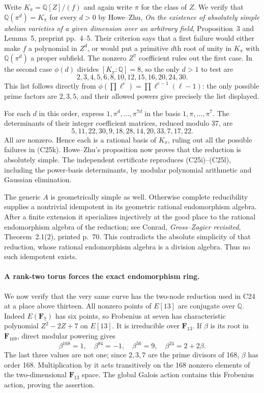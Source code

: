 \documentclass[11pt]{article}
\newcommand{\Q}{\mathbb Q}\newcommand{\C}{\mathbb C}\newcommand{\Z}{\mathbb Z}\newcommand{\R}{\mathbb R}\newcommand{\A}{\mathbb A}\newcommand{\OO}{\mathcal O}
\theoremstyle{definition}\newtheorem{definition}[theorem]{Definition}\newtheorem{remark}[theorem]{Remark}
\begin{document}
Write $K_\pi=\Q[Z]/(f)$ and again write $\pi$ for the
class of $Z$. We verify that $\Q(\pi^d)=K_\pi$ for
every $d>0$ by Howe--Zhu, \emph{On the existence of
absolutely simple abelian varieties of a given dimension
over an arbitrary field}, Proposition~3 and Lemma~5,
preprint pp.~4--5. Their criterion says that a first
failure would either make $f$ a polynomial in $Z^d$,
or would put a primitive $d$th root of unity in
$K_\pi$ with $\Q(\pi^d)$ a proper subfield.
The nonzero $Z^7$ coefficient rules out the first case.
In the second case $\phi(d)$ divides $[K_\pi:\Q]=8$,
so the only $d>1$ to test are
\[
 2,3,4,5,6,8,10,12,15,16,20,24,30.
 \tag{C25k}
\]
This list follows directly from
$\phi(\prod\ell^e)=\prod\ell^{e-1}(\ell-1)$:
the only possible prime factors are $2,3,5$, and their
allowed powers give precisely the list displayed.

For each $d$ in this order, express
$1,\pi^d,\ldots,\pi^{7d}$ in the basis
$1,\pi,\ldots,\pi^7$. The determinants of their
integer coefficient matrices, reduced modulo 37, are
\[
 5,11,22,30,9,18,28,14,20,33,7,17,22.
 \tag{C25l}
\]
All are nonzero. Hence each is a rational basis of
$K_\pi$, ruling out all the possible failures in
(C25k). Howe--Zhu's proposition now proves that the
reduction is absolutely simple. The independent
certificate reproduces (C25i)--(C25l), including the
power-basis determinants, by modular polynomial
arithmetic and Gaussian elimination.

The generic $A$ is geometrically simple as well.
Otherwise complete reducibility supplies a nontrivial
idempotent in its geometric rational endomorphism
algebra. After a finite extension it specializes
injectively at the good place to the rational
endomorphism algebra of the reduction; see Conrad,
\emph{Gross--Zagier revisited}, Theorem~2.1(2),
printed p.~70. This contradicts the absolute simplicity
of that reduction, whose rational endomorphism algebra
is a division algebra. Thus no such idempotent exists.

\paragraph{A rank-two torus forces the exact endomorphism ring.}
We now verify that the very same curve has the two-node
reduction used in C24 at a place above thirteen.
All nonzero points of $E[13]$ are conjugate over $\Q$.
Indeed $E(\mathbf F_7)$ has six points, so Frobenius at
seven has characteristic polynomial
$Z^2-2Z+7$ on $E[13]$.
It is irreducible over $\mathbf F_{13}$.
If $\beta$ is its root in $\mathbf F_{169}$, direct
modular powering gives
\[
 \beta^{168}=1,\quad
 \beta^{84}=-1,\quad
 \beta^{56}=9,\quad
 \beta^{24}=2+2\beta.
 \tag{C25m}
\]
The last three values are not one; since $2,3,7$ are
the prime divisors of 168, $\beta$ has order 168.
Multiplication by it acts transitively on the 168
nonzero elements of the two-dimensional $\mathbf F_{13}$
space. The global Galois action contains this Frobenius
action, proving the assertion.
\end{document}

